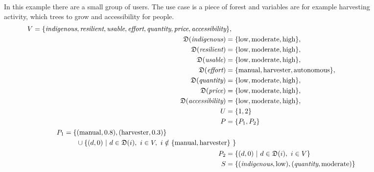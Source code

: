 \begin{figure}
    \begin{mdframed}[frametitle={Example for Forest Use Case}]
        In this example there are a small group of users. The use case is a piece of forest and variables are for example harvesting activity, which trees to grow and accessibility for people.
        \begin{align}
            \begin{split}
                V = \{ & \textit{indigenous}, \textit{resilient}, \textit{usable}, \textit{effort}, \textit{quantity}, \textit{price}, \textit{accessibility} \},
            \end{split} \notag \\
            \mathfrak{D}(\textit{indigenous}) =  \{ & \text{low}, \text{moderate}, \text{high}\}, \notag \\
            \mathfrak{D}(\textit{resilient}) = \{ & \text{low}, \text{moderate}, \text{high}\}, \notag \\
            \mathfrak{D}(\textit{usable}) = \{ & \text{low}, \text{moderate}, \text{high}\}, \notag \\
            \mathfrak{D}(\textit{effort}) = \{ & \text{manual}, \text{harvester}, \text{autonomous}\}, \notag \\
            \mathfrak{D}(\textit{quantity}) = \{ & \text{low}, \text{moderate}, \text{high}\}, \notag \\
            \mathfrak{D}(\textit{price}) = \{ & \text{low}, \text{moderate}, \text{high}\}, \notag\\
            \mathfrak{D}(\textit{accessibility}) = \{ & \text{low}, \text{moderate}, \text{high}\},\notag \\
            U = \{ & 1,2\} \notag\\
            P = \{ & P_1, P_2\} \notag\\
            \begin{split}
                P_1 = \{ & (\text{manual}, 0.8), (\text{harvester}, 0.3) \} \\ 
                & \cup \{ (d,0)\ |\ d \in \mathfrak{D}(i),\ i \in V,\ i \notin \{ \text{manual}, \text{harvester}\} \ \} \ 
            \end{split} \notag \\
            P_2 = \{ & (d,0)\ |\ d \in \mathfrak{D}(i),\ i \in V \} \notag \\
            S  =  \{ & (\textit{indigenous}, \text{low}), (\textit{quantity}, \text{moderate}) \} \notag \\

\end{align}
\end{mdframed}
\end{figure}
